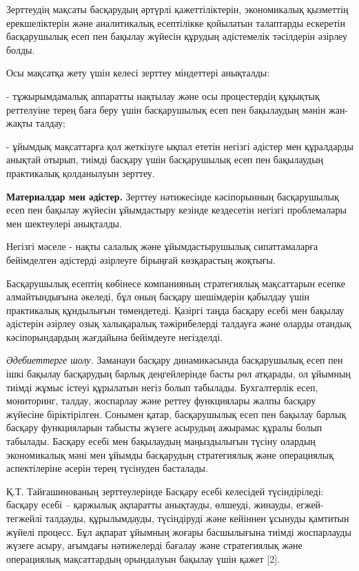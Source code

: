 \begin{multicols}{2}
Зерттеудің мақсаты басқарудың әртүрлі қажеттіліктерін, экономикалық
қызметтің ерекшеліктерін және аналитикалық есептілікке қойылатын
талаптарды ескеретін басқарушылық есеп пен бақылау жүйесін құрудың
әдістемелік тәсілдерін әзірлеу болды.

Осы мақсатқа жету үшін келесі зерттеу міндеттері анықталды:

- тұжырымдамалық аппаратты нақтылау және осы процестердің құқықтық
реттелуіне терең баға беру үшін басқарушылық есеп пен бақылаудың мәнін
жан-жақты талдау; 

- ұйымдық мақсаттарға қол жеткізуге ықпал ететін негізгі әдістер мен
құралдарды анықтай отырып, тиімді басқару үшін басқарушылық есеп пен
бақылаудың практикалық қолданылуын зерттеу.

{\bfseries Материалдар мен әдістер.} Зерттеу нәтижесінде кәсіпорынның
басқарушылық есеп пен бақылау жүйесін ұйымдастыру кезінде кездесетін
негізгі проблемалары мен шектеулері анықталды.

Негізгі мәселе - нақты салалық және ұйымдастырушылық сипаттамаларға
бейімделген әдістерді әзірлеуге бірыңғай көзқарастың жоқтығы.

Басқарушылық есептің көбінесе компанияның стратегиялық мақсаттарын
есепке алмайтындығына әкеледі, бұл оның басқару шешімдерін қабылдау үшін
практикалық құндылығын төмендетеді. Қазіргі таңда басқару есебі мен
бақылау әдістерін әзірлеу озық халықаралық тәжірибелерді талдауға және
оларды отандық кәсіпорындардың жағдайына бейімдеуге негізделді.

\emph{Әдебиеттерге шолу.} Заманауи басқару динамикасында басқарушылық
есеп пен ішкі бақылау басқарудың барлық деңгейлерінде басты рөл
атқарады, ол ұйымның тиімді жұмыс істеуі құрылатын негіз болып табылады.
Бухгалтерлік есеп, мониторинг, талдау, жоспарлау және реттеу функциялары
жалпы басқару жүйесіне біріктірілген. Сонымен қатар, басқарушылық есеп
пен бақылау барлық басқару функцияларын табысты жүзеге асырудың ажырамас
құралы болып табылады. Басқару есебі мен бақылаудың маңыздылығын түсіну
олардың экономикалық мәні мен ұйымды басқарудың стратегиялық және
операциялық аспектілеріне әсерін терең түсінуден басталады.

Қ.Т. Тайғашинованың зерттеулерінде Басқару есебі келесідей
түсіндіріледі: басқару есебі -- қаржылық ақпаратты анықтауды, өлшеуді,
жинауды, егжей-тегжейлі талдауды, құрылымдауды, түсіндіруді және
кейіннен ұсынуды қамтитын жүйелі процесс. Бұл ақпарат ұйымның жоғары
басшылығына тиімді жоспарлауды жүзеге асыру, ағымдағы нәтижелерді
бағалау және стратегиялық және операциялық мақсаттардың орындалуын
бақылау үшін қажет {[}2{]}.


\end{multicols}
